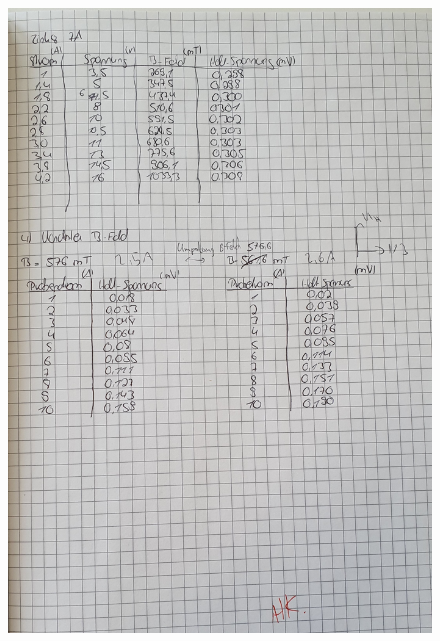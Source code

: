 \begin{figure}[H]
    \centering
    \includegraphics[width=\textwidth]{content/v511_Laborbuch2.jpg}
\end{figure}

%









